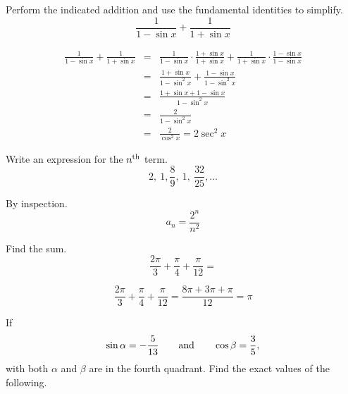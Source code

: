 \documentclass[12pt,addpoints, answers, fleqn]{exam}
\begin{document}
\begin{questions}
\question Perform the indicated addition and use the fundamental identities to simplify.
\[
\frac{1}{1 - \sin x} + \frac{1}{1 + \sin x}
\]
\begin{solution}
\begin{eqnarray*}
\frac{1}{1 - \sin x} + \frac{1}{1 + \sin x} &=& \frac{1}{1 - \sin x} \cdot \frac{1 + \sin x}{1 + \sin x}  + \frac{1}{1 + \sin x} \cdot \frac{1 - \sin x}{1 - \sin x}\\
 &=& \frac{1 + \sin x}{1 - \sin^2 x}  +  \frac{1 - \sin x}{1 - \sin^2 x}\\
  &=& \frac{1 + \sin x + 1 - \sin x}{1 - \sin^2 x}\\
  &=& \frac{2}{1 - \sin^2 x}\\
  &=& \boxed{\frac{2}{\cos^2 x}} = \boxed{2 \sec^2 x}
\end{eqnarray*}
\end{solution}
\question Write an expression for the $n^{\rm{th}}$ term.
\[
2, \ 1, \frac{8}{9}, \ 1, \ \frac{32}{25}, \ldots
\]
\begin{solution}
By inspection.
\[
\boxed{a_n = \frac{2^n}{n^2}}
\]
\end{solution}
\question Find the sum.
\[
\frac{2\pi}{3} + \frac{\pi}{4} + \frac{\pi}{12} = 
\]
\begin{solution}
\[
\frac{2\pi}{3} + \frac{\pi}{4} + \frac{\pi}{12} = 
\frac{8\pi + 3\pi + \pi}{12} = \boxed{\pi}
\]
\end{solution}
\question If
\[
\sin \alpha =  \displaystyle - \frac{5}{13} \qquad {\rm{and}} \qquad  \cos \beta = \displaystyle  \frac{3}{5},
\]
with both $\alpha$ and $\beta$ are in the fourth quadrant. Find the exact values of the following.

\end{questions}
\end{document}
